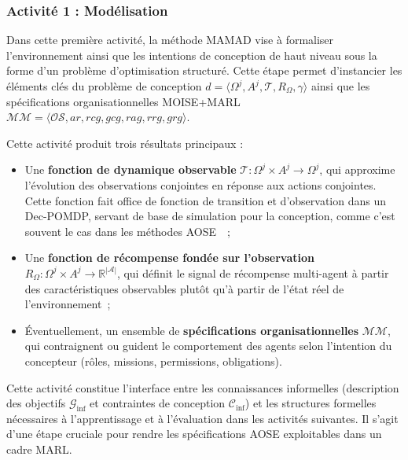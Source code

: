 

\subsubsection{Activité 1 : Modélisation}\label{sec:modelling}

Dans cette première activité, la méthode MAMAD vise à formaliser l'environnement ainsi que les intentions de conception de haut niveau sous la forme d'un problème d'optimisation structuré. Cette étape permet d'instancier les éléments clés du problème de conception $d = \langle \Omega^j, A^j, \mathcal{T}, R_{\Omega}, \gamma \rangle$ ainsi que les spécifications organisationnelles MOISE+MARL $\mathcal{MM} = \langle \mathcal{OS}, ar, rcg, gcg, rag, rrg, grg \rangle$.

Cette activité produit trois résultats principaux :

\begin{itemize}
    \item Une \textbf{fonction de dynamique observable} $\mathcal{T}: \Omega^j \times A^j \rightarrow \Omega^j$, qui approxime l'évolution des observations conjointes en réponse aux actions conjointes. Cette fonction fait office de fonction de transition et d'observation dans un Dec-POMDP, servant de base de simulation pour la conception, comme c'est souvent le cas dans les méthodes AOSE~\cite{Jamont2O15}~;

    \item Une \textbf{fonction de récompense fondée sur l'observation} $R_{\Omega}: \Omega^j \times A^j \rightarrow \mathbb{R}^{|\mathcal{A}|}$, qui définit le signal de récompense multi-agent à partir des caractéristiques observables plutôt qu'à partir de l'état réel de l'environnement~;

    \item Éventuellement, un ensemble de \textbf{spécifications organisationnelles} $\mathcal{MM}$, qui contraignent ou guident le comportement des agents selon l'intention du concepteur (rôles, missions, permissions, obligations).
\end{itemize}

Cette activité constitue l'interface entre les connaissances informelles (description des objectifs $\mathcal{G}_{\text{inf}}$ et contraintes de conception $\mathcal{C}_{\text{inf}}$) et les structures formelles nécessaires à l'apprentissage et à l'évaluation dans les activités suivantes. Il s'agit d'une étape cruciale pour rendre les spécifications AOSE exploitables dans un cadre MARL.

